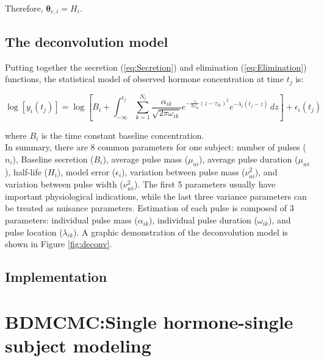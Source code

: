 \documentclass[11pt]{book}
\newcommand{\beq}{\begin{equation}}
\newcommand{\eeq}{\end{equation}}
\begin{document}

Therefore, $\boldsymbol{\theta}_{e,i} = H_i$.

\section{The deconvolution model} Putting together the secretion (\ref{eq:Secretion}) and elimination (\ref{eq:Elimination}) functions, the statistical model of observed hormone concentration at time $t_j$ is:


\beq
\log[y_i(t_j)]=\log\left[B_i + \int_{-\infty}^{t_j} \sum_{k=1}^{N_i}  \frac{\alpha_{ik}}{\sqrt{2\pi\omega_{ik}}}e^{-\frac{1}{2\omega_{ik}}(z-\tau_{ik})^2} e^{-\lambda_i(t_j-z)}\,dz\right]+\epsilon_i(t_j)
\label{eq:DeconModel}
\eeq


\noindent where $B_i$ is the time constant baseline concentration.\\
In summary, there are 8 common parameters for one subject: number of pulses ($n_i$), Baseline secretion ($B_i$), average pulse mass ($\mu_{ai}$), average pulse duration ($\mu_{wi}$), half-life ($H_i$), model error ($\epsilon_i$), variation between pulse mass ($\nu^2_{ai}$), and variation between pulse width ($\nu^2_{wi}$). The first 5 parameters usually have important physiological indications, while the last three variance parameters can be treated as nuisance parameters.  Estimation of each pulse is composed of 3 parameters: individual pulse mass ($\alpha_{ik}$), individual pulse duration ($\omega_{ik}$), and pulse location ($\lambda_{ik}$). A graphic demonstration of the deconvolution model is shown in Figure \ref{fig:deconv}.







\section{Implementation}








\chapter{BDMCMC:Single hormone-single subject modeling}
\end{document}
